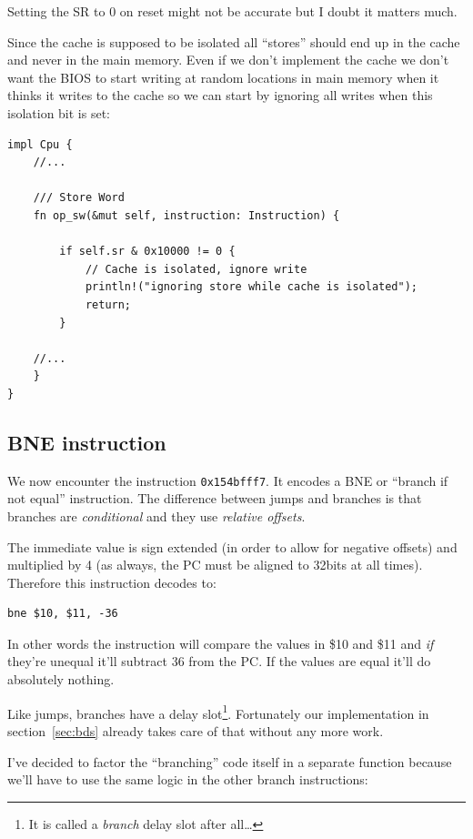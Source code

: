 \documentclass[a4paper]{article}
\newcommand{\code}[1] {\texttt{#1}}
\begin{document}
Setting the SR to 0 on reset might not be accurate but I doubt it
matters much.

Since the cache is supposed to be isolated all ``stores'' should end
up in the cache and never in the main memory. Even if we don't
implement the cache we don't want the BIOS to start writing at random
locations in main memory when it thinks it writes to the cache so we
can start by ignoring all writes when this isolation bit is set:

\begin{lstlisting}
impl Cpu {
    //...

    /// Store Word
    fn op_sw(&mut self, instruction: Instruction) {

        if self.sr & 0x10000 != 0 {
            // Cache is isolated, ignore write
            println!("ignoring store while cache is isolated");
            return;
        }

	//...
    }
}
\end{lstlisting}

\subsection{BNE instruction}

We now encounter the instruction \code{0x154bfff7}. It encodes a BNE
or ``branch if not equal'' instruction. The difference between jumps
and branches is that branches are \emph{conditional} and they use
\emph{relative offsets}.

The immediate value is sign extended (in order to allow for negative
offsets) and multiplied by 4 (as always, the PC must be aligned to
32bits at all times). Therefore this instruction decodes to:

\begin{lstlisting}[language=assembly]
bne $10, $11, -36
\end{lstlisting}

In other words the instruction will compare the values in \$10 and
\$11 and \emph{if} they're unequal it'll subtract 36 from the
PC. If the values are equal it'll do absolutely nothing.

Like jumps, branches have a delay slot\footnote{It is called a
  \emph{branch} delay slot after all\dots}. Fortunately our
implementation in section~\ref{sec:bds} already takes care of that
without any more work.

I've decided to factor the ``branching'' code itself in a separate
function because we'll have to use the same logic in the other branch
instructions:
\end{document}
